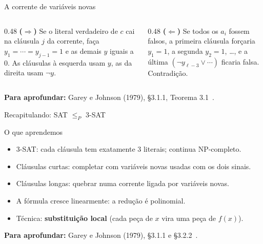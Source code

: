 \documentclass[aspectratio=169,xcolor=table]{beamer}
\newcommand{\fonte}[1]{%
  \vfill
  {\tiny\color{gray!55!black}\textbf{Para aprofundar:} #1\par}%
}
\newcommand{\prob}[1]{\textsc{#1}}
\newcommand{\nao}{\lnot}
\begin{document}
\begin{frame}{A corrente de variáveis novas}
  \begin{center}
  \end{center}
  \begin{columns}[T]
    \begin{column}{0.48\textwidth}
      \scriptsize
      \textbf{($\Rightarrow$)} Se o literal verdadeiro de $c$ cai na cláusula $j$ da
      corrente, faça $y_1 = \cdots = y_{j-1} = 1$ e as demais $y$ iguais a $0$. As
      cláusulas à esquerda usam $y$, as da direita usam $\nao y$.
    \end{column}
    \begin{column}{0.48\textwidth}
      \scriptsize
      \textbf{($\Leftarrow$)} Se todos os $a_i$ fossem falsos, a primeira cláusula forçaria
      $y_1 = 1$, a segunda $y_2 = 1$, \ldots, e a última $(\nao y_{\ell-3} \lor \cdots)$
      ficaria falsa. Contradição.
    \end{column}
  \end{columns}
  \fonte{Garey e Johnson (1979), \S 3.1.1, Teorema 3.1~\cite{garey1979computers}.}
\end{frame}

\begin{frame}{Recapitulando: \prob{SAT} $\le_P$ \prob{3-SAT}}
  \begin{block}{O que aprendemos}
    \begin{itemize}
      \item \prob{3-SAT}: cada cláusula tem exatamente $3$ literais; continua NP-completo.
      \item Cláusulas curtas: completar com variáveis novas usadas com os dois sinais.
      \item Cláusulas longas: quebrar numa corrente ligada por variáveis novas.
      \item A fórmula cresce linearmente: a redução é polinomial.
      \item Técnica: \textbf{substituição local} (cada peça de $x$ vira uma peça de $f(x)$).
    \end{itemize}
  \end{block}
  \fonte{Garey e Johnson (1979), \S 3.1.1 e \S 3.2.2~\cite{garey1979computers}.}
\end{frame}
\end{document}
